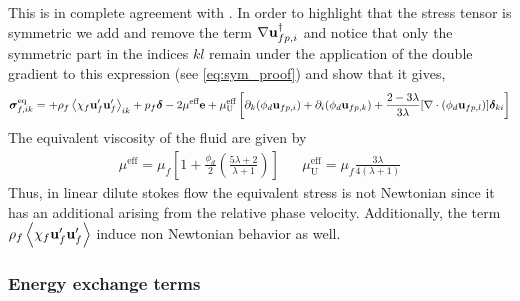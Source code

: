 This is in complete agreement with \citet[Appendix A]{zhang1997momentum}. 
In order to highlight that the stress tensor is symmetric we add and remove the term $ \mathbf{\nabla} \textbf{u}_{fp,i}^\dagger$ and notice that only the symmetric part in the indices $kl$ remain under the application of the double gradient to this expression  (see \ref{eq:sym_proof}) and show that it gives, 
\begin{align}
    \bm{\sigma}^\text{eq}_{f,ik} =
    + \rho_f\left<\chi_f\textbf{u}_f'\textbf{u}_f'\right>_{ik} 
    + p_f \bm\delta
    - 2\mu^\text{eff} \textbf{e}
    + 
    \mu_\text{U}^\text{eff}
    \left[
        \partial_k   (\phi_d\textbf{u}_{fp,i})
        + \partial_i (\phi_d\textbf{u}_{fp,k})
        + \frac{2-3\lambda}{3\lambda}  [\mathbf{\nabla}\cdot (\phi_d\textbf{u}_{fp,l})]\bm\delta_{ki}
    \right]
    \label{eq:fluid_phase_stress}
\end{align} 
The equivalent viscosity of the fluid are given by 
\begin{align*}
    \mu^\text{eff} = \mu_f \left[
        1
        +\frac{\phi_d}{2}\left(
            \frac{5\lambda +2}{\lambda +1}
        \right)
    \right] &&
    \mu^\text{eff}_\text{U}
    = \mu_f\frac{ 3\lambda}{4(\lambda +1) }
\end{align*}
Thus, in linear dilute stokes flow the equivalent stress is not Newtonian since it has an additional arising from the relative phase velocity. 
Additionally, the term $\rho_f\left<\chi_f\textbf{u}_f'\textbf{u}_f'\right>$ induce non Newtonian behavior as well. 

\subsubsection{Energy exchange terms}


